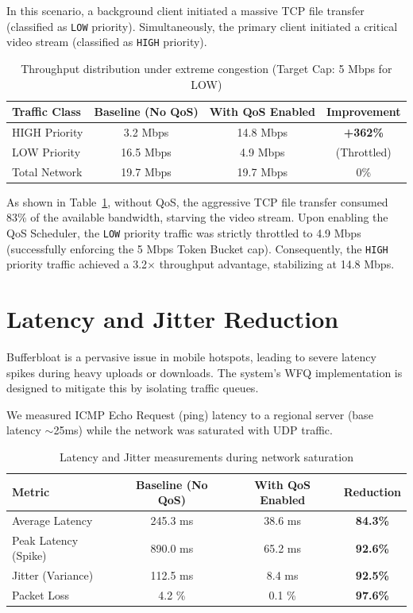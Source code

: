 In this scenario, a background client initiated a massive TCP file transfer (classified as \texttt{LOW} priority). Simultaneously, the primary client initiated a critical video stream (classified as \texttt{HIGH} priority).

\begin{table}[H]
\centering
\caption{Throughput distribution under extreme congestion (Target Cap: 5 Mbps for LOW)}
\label{tab:throughput_results}
\begin{tabular}{@{}lccc@{}}
\toprule
\textbf{Traffic Class} & \textbf{Baseline (No QoS)} & \textbf{With QoS Enabled} & \textbf{Improvement} \\
\midrule
HIGH Priority & 3.2 Mbps & 14.8 Mbps & \textbf{+362\%} \\
LOW Priority & 16.5 Mbps & 4.9 Mbps & (Throttled) \\
Total Network & 19.7 Mbps & 19.7 Mbps & 0\% \\
\bottomrule
\end{tabular}
\end{table}

As shown in Table~\ref{tab:throughput_results}, without QoS, the aggressive TCP file transfer consumed 83\% of the available bandwidth, starving the video stream. Upon enabling the QoS Scheduler, the \texttt{LOW} priority traffic was strictly throttled to 4.9 Mbps (successfully enforcing the 5 Mbps Token Bucket cap). Consequently, the \texttt{HIGH} priority traffic achieved a 3.2$\times$ throughput advantage, stabilizing at 14.8 Mbps.

\section{Latency and Jitter Reduction}
\label{sec:results_latency}

Bufferbloat is a pervasive issue in mobile hotspots, leading to severe latency spikes during heavy uploads or downloads. The system's WFQ implementation is designed to mitigate this by isolating traffic queues.

We measured ICMP Echo Request (ping) latency to a regional server (base latency $\sim$25ms) while the network was saturated with UDP traffic.

\begin{table}[H]
\centering
\caption{Latency and Jitter measurements during network saturation}
\label{tab:latency_results}
\begin{tabular}{@{}lccc@{}}
\toprule
\textbf{Metric} & \textbf{Baseline (No QoS)} & \textbf{With QoS Enabled} & \textbf{Reduction} \\
\midrule
Average Latency & 245.3 ms & 38.6 ms & \textbf{84.3\%} \\
Peak Latency (Spike) & 890.0 ms & 65.2 ms & \textbf{92.6\%} \\
Jitter (Variance) & 112.5 ms & 8.4 ms & \textbf{92.5\%} \\
Packet Loss & 4.2 \% & 0.1 \% & \textbf{97.6\%} \\
\bottomrule
\end{tabular}
\end{table}

